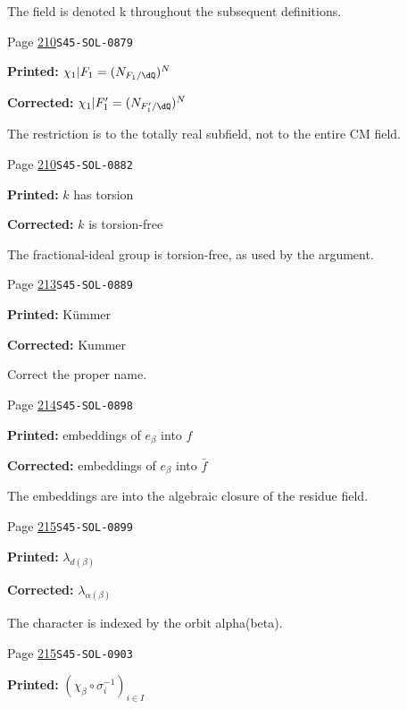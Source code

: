 \begin{description}
\par\noindent The field is denoted k throughout the subsequent definitions.
\smallskip
\item[\hypertarget{apparatus:EN-0151}{151}] Page \hyperlink{printpage:en:210}{210}\quad\texttt{S45-SOL-0879}
\par\noindent\textbf{Printed:} \(\chi_1|F_1=(N_{F_1/\dQ})^N\)
\par\noindent\textbf{Corrected:} \(\chi_1|F_1'=(N_{F_1'/\dQ})^N\)
\par\noindent The restriction is to the totally real subfield, not to the entire CM field.
\smallskip
\item[\hypertarget{apparatus:EN-0152}{152}] Page \hyperlink{printpage:en:210}{210}\quad\texttt{S45-SOL-0882}
\par\noindent\textbf{Printed:} $k$ has torsion
\par\noindent\textbf{Corrected:} $k$ is torsion-free
\par\noindent The fractional-ideal group is torsion-free, as used by the argument.
\smallskip
\item[\hypertarget{apparatus:EN-0153}{153}] Page \hyperlink{printpage:en:213}{213}\quad\texttt{S45-SOL-0889}
\par\noindent\textbf{Printed:} K\"ummer
\par\noindent\textbf{Corrected:} Kummer
\par\noindent Correct the proper name.
\smallskip
\item[\hypertarget{apparatus:EN-0154}{154}] Page \hyperlink{printpage:en:214}{214}\quad\texttt{S45-SOL-0898}
\par\noindent\textbf{Printed:} embeddings of $e_\beta$ into $f$
\par\noindent\textbf{Corrected:} embeddings of $e_\beta$ into $\bar f$
\par\noindent The embeddings are into the algebraic closure of the residue field.
\smallskip
\item[\hypertarget{apparatus:EN-0155}{155}] Page \hyperlink{printpage:en:215}{215}\quad\texttt{S45-SOL-0899}
\par\noindent\textbf{Printed:} \(\lambda_{d(\beta)}\)
\par\noindent\textbf{Corrected:} \(\lambda_{\alpha(\beta)}\)
\par\noindent The character is indexed by the orbit alpha(beta).
\smallskip
\item[\hypertarget{apparatus:EN-0156}{156}] Page \hyperlink{printpage:en:215}{215}\quad\texttt{S45-SOL-0903}
\par\noindent\textbf{Printed:} \((\chi_\beta\circ \sigma_i^{-1})_{i\in I}\)

\end{description}
